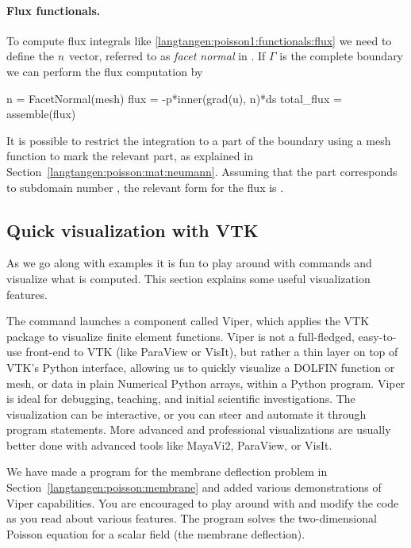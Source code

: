\paragraph{Flux functionals.}
To compute flux integrals like
\eqref{langtangen:poisson1:functionals:flux} we need to define the
${n}$ vector, referred to as \emph{facet normal} in
\fenics. If $\Gamma$ is the complete boundary we can perform the flux
computation by
\begin{python}
n = FacetNormal(mesh)
flux = -p*inner(grad(u), n)*ds
total_flux = assemble(flux)
\end{python}
It is possible to restrict the integration to a part of the boundary
using a mesh function to mark the relevant part, as explained in
Section~\ref{langtangen:poisson:mat:neumann}. Assuming that the part
corresponds to subdomain number , the relevant form for the flux
is .

\subsection{Quick visualization with VTK}
\label{langtangen:quickviz}

As we go along with examples it is fun to play around with 
commands and visualize what is computed. This section explains some
useful visualization features.

The  command launches a \fenics{} component called Viper,
which applies the VTK package to visualize finite element functions.
Viper is not a full-fledged, easy-to-use front-end to VTK (like ParaView
or VisIt), but rather a thin layer on top of VTK's Python interface,
allowing us to quickly visualize a DOLFIN function or mesh, or data
in plain Numerical Python arrays, within a Python program.  Viper is
ideal for debugging, teaching, and initial scientific investigations.
The visualization can be interactive, or you can steer and automate it
through program statements.  More advanced and professional visualizations
are usually better done with advanced tools like MayaVi2, ParaView,
or VisIt.

We have made a program  for the membrane deflection
problem in Section~\ref{langtangen:poisson:membrane} and added various
demonstrations of Viper capabilities. You are encouraged to play around
with  and modify the code as you read about various
features.  The  program solves the two-dimensional
Poisson equation for a scalar field  (the membrane deflection).


